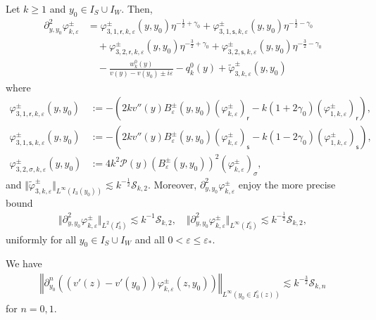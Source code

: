 \documentclass[10pt,a4paper]{amsart}
\newcommand\cS{{\mathcal S}}
\newcommand{\ep}{\varepsilon}
\newcommand{\sr}{{\mathsf{r}}}
\newcommand{\s}{{\mathsf{s}}}
\renewcommand{\P}{{\mathcal{P}}}
\begin{document}
\begin{proposition}\label{prop:Xkpypynotvarphi}
Let $k\geq 1$ and $y_0\in I_S\cup I_W$. Then,
\begin{equation}\label{eq:decomXkpypynotvarphi}
\begin{split}
\partial_{y,y_0}^2\varphi_{k,\ep}^\pm &= \varphi_{3,1,\sr,k,\ep}^\pm(y,y_0) \eta^{-\frac12+\gamma_0} + \varphi_{3,1,\s,k,\ep}^\pm(y,y_0) \eta^{-\frac12-\gamma_0} \\
&\quad + \varphi_{3,2,\sr,k,\ep}^\pm(y,y_0) \eta^{-\frac32+\gamma_0} + \varphi_{3,2,\s,k,\ep}^\pm(y,y_0) \eta^{-\frac32-\gamma_0} \\ 
&\quad - \frac{ w_k^0(y)}{v(y) - v(y_0) \pm i\ep} - q_k^0(y) + \widetilde\varphi_{3,k,\ep}^\pm(y,y_0) 
\end{split}
\end{equation}
where
\begin{align*}
\varphi_{3,1,\sr,k,\ep}^\pm(y,y_0) &:= -\left( 2kv''(y)B_{\ep}^\pm(y,y_0)  \left( \varphi_{k,\ep}^\pm \right)_\sr - k(1+2\gamma_0) \left( \varphi_{1,k,\ep}^\pm \right)_\sr \right),  \\
\varphi_{3,1,\s,k,\ep}^\pm(y,y_0) &:=-\left( 2kv''(y)B_{\ep}^\pm(y,y_0)  \left( \varphi_{k,\ep}^\pm \right)_\s - k(1-2\gamma_0) \left( \varphi_{1,k,\ep}^\pm \right)_\s \right), \\
\varphi_{3,2,\sigma,k,\ep}^\pm(y,y_0) &:=  4k^2\P(y) (B_{\ep}^\pm(y,y_0))^2  \left( \varphi_{k,\ep}^\pm \right)_\sigma, 
\end{align*}
and $\Vert \widetilde{\varphi}_{3,k,\ep}^\pm \Vert_{L^\infty(I_3(y_0))} \lesssim k^{-\frac12}\cS_{k,2}$. Moreover, $\partial_{y,y_0}^2\varphi_{k,\ep}^\pm$ enjoy the more precise bound
\begin{align*}
\Vert \partial_{y,y_0}^2\varphi_{k,\ep}^\pm \Vert_{L^2(I_3^c)} \lesssim  k^{-1}\cS_{k,2}, \quad \Vert \partial_{y,y_0}^2\varphi_{k,\ep}^\pm \Vert_{L^\infty(I_3^c)} \lesssim k^{-\frac12}\cS_{k,2},
\end{align*}
uniformly for all $y_0\in I_S\cup I_{W}$ and all $0 < \ep\leq \ep_*$.
\end{proposition}

\begin{proposition}\label{prop:LinfpynotcV}
We have
\begin{align*}
\left \Vert \partial_{y_0}^n\left( (v'(z) - v'(y_0)) \varphi_{k,\ep}^\pm(z,y_0) \right) \right\Vert_{L^\infty(y_0\in I_3^c(z))}  \lesssim k^{-\frac32}\cS_{k,n}
\end{align*}
for $n=0,1$.
\end{proposition}
\end{document}
